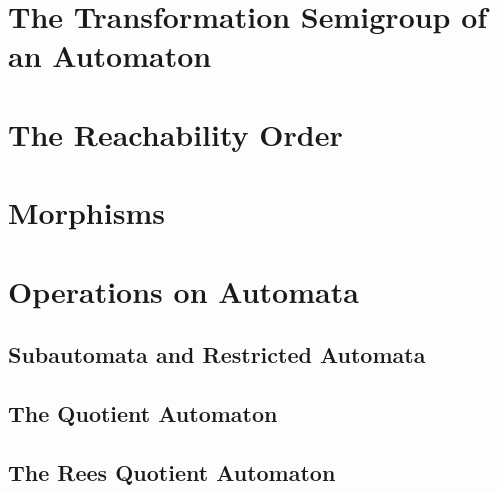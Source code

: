 

\section{The Transformation Semigroup of an Automaton}
\label{prelim:subsec:transsemigrp}



\section{The Reachability Order}
\label{prelim:sec:reach} 
\label{prelim:subsec:reachorder}



\section{Morphisms} 
\label{prelim:subsubsec:endo_aut}



\section{Operations on Automata}

\subsection{Subautomata and Restricted Automata}
\label{prelim:sec:aut:sub}



\subsection{The Quotient Automaton}
\label{prelim:sec:aut:factor}



\subsection{The Rees Quotient Automaton}
\label{prelim:sec:rees} 

